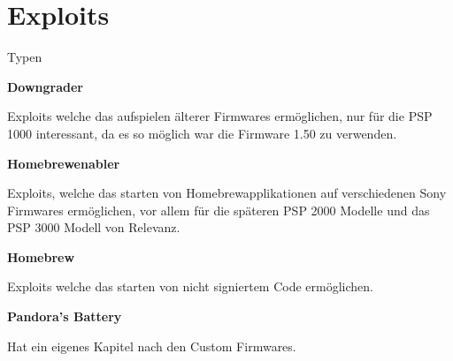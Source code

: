 \documentclass[mode=print,paper=screen,size=10pt,style=paintings]{powerdot}
\begin{document}
\section{Exploits}
\begin{slide}{Typen}
	\begin{large}\textbf{Downgrader}\end{large}\linebreak
	Exploits welche das aufspielen älterer Firmwares ermöglichen, nur für die PSP 1000 interessant, da es so möglich war die Firmware 1.50 zu verwenden.\linebreak
	\linebreak
	\begin{large}\textbf{Homebrewenabler}\end{large}\linebreak
	Exploits, welche das starten von Homebrewapplikationen auf verschiedenen Sony Firmwares ermöglichen, vor allem für die
	späteren PSP 2000 Modelle und das PSP 3000 Modell von Relevanz.\linebreak
	\linebreak
	\begin{large}\textbf{Homebrew}\end{large}\linebreak
	Exploits welche das starten von nicht signiertem Code ermöglichen.\linebreak
	\linebreak
	\begin{large}\textbf{Pandora's Battery}\end{large}\linebreak
	Hat ein eigenes Kapitel nach den Custom Firmwares.
\end{slide}
\end{document}
